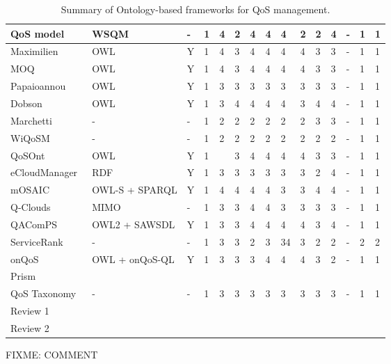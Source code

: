 \begin{sidewaystable}[!ht]
\begin{center}
\begin{tabular}[c]{|p{2.5cm}|p{1.2cm}|p{1.2cm}|p{1.2cm}|p{0.8cm}|p{0.8cm}|p{0.8cm}|p{0.8cm}|p{1.1cm}|p{1.1cm}|p{1.1cm}|p{1.1cm}|p{1.1cm}|p{1.1cm}|p{1.1cm}|}
   QoS model~\cite{Mabrouk:2009:SEQ:1564601.1564724} & WSQM & - &1 &4 &2 &4 &4 &4 &2 &2 &4 &- &1 &1 \\ \hline
   Maximilien~\cite{Maximilien:2004:FOD:1024866.1025003} & OWL & Y & 1&4 &3 &4 &4 &4 &4 &3 &3 &- &1 &1 \\ \hline
   MOQ~\cite{Kim:2007:MWS:1359823.1359827} & OWL & Y & 1&4 &3 &4 &4 &4 &4 &3 &3 &- &1 &1 \\ \hline
   Papaioannou\cite{Papaioannou:2006:QOL:1129027.1129054} & OWL & Y & 1&3 &3 &3 &3 &3 &3 &3 &3 &- &1 &1 \\ \hline
   Dobson~\cite{Dobson:2006:TUQ:1173701.1174285} & OWL & Y & 1&3 &4 &4 &4 &4 &3 &4 &4 &- &1 &1 \\ \hline
   Marchetti~\cite{Marchetti:2004:QMM:1013367.1013377} & - & - & 1 &2 &2 &2 &2 &2 &2 &3 &3 &- &1 &1 \\ \hline
   WiQoSM~\cite{Resta:2008:WIQ:1340085.1340215} & - & - & 1 &2 &2 &2 &2 &2 &2 &2 &2 &- &1 &1 \\ \hline
   QoSOnt~\cite{Dobson:2005:QQO:1090946.1091252} & OWL & Y & 1&  &3 &4 &4 &4 &4 &3 &3 &- &1 &1 \\ \hline
   eCloudManager~\cite{Haase:2010:STE:1940334.1940342} & RDF & Y & 1& 3 &3 &3 &3 &3 &3 &2 &4 &- &1 &1 \\ \hline
   mOSAIC~\cite{Cretella:2012:UMS:2428736.2428805} & OWL-S + SPARQL & Y & 1 & 4 &4 &4 &4 &3 &3 &4 &4 &- &1 &1 \\ \hline
   Q-Clouds~\cite{Nathuji:2010:QMP:1755913.1755938} & MIMO & - & 1 & 3 &3 &4 &4 &3 &3 &3 &3 &- &1 &1 \\ \hline
   QAComPS~\cite{dewqacomps} & OWL2 + SAWSDL & Y & 1 & 3 &3 &4 &4 &4 &4 &3 &4 &- &1 &1 \\ \hline
   ServiceRank~\cite{Wu:2009:CQS:1696051.1696105} & - & - & 1 & 3 &3 &2 &3 &34 &3 &2 &2 &- &2 &2 \\ \hline
   onQoS~\cite{Damiano:2009:OQL:1506129.1506143} & OWL + onQoS-QL & Y & 1 & 3 &3 &3 &4 &4 &4 &3 &2 &- &1 &1 \\ \hline
   Prism & & & & & & & & & & & & & & \\ \hline
   QoS Taxonomy~\cite{qos-taxonomy} & - & - & 1 & 3 & 3 &3 &3 &3 &3 &3 &3 &- &1 &1 \\ \hline
   Review 1 & & & & & & & & & & & & & & \\ \hline
   Review 2 & & & & & & & & & & & & & & \\ \hline     
\hline
\end{tabular}
\caption{Summary of Ontology-based frameworks for QoS management.}
  \end{center}
\end{sidewaystable} 

FIXME: COMMENT

